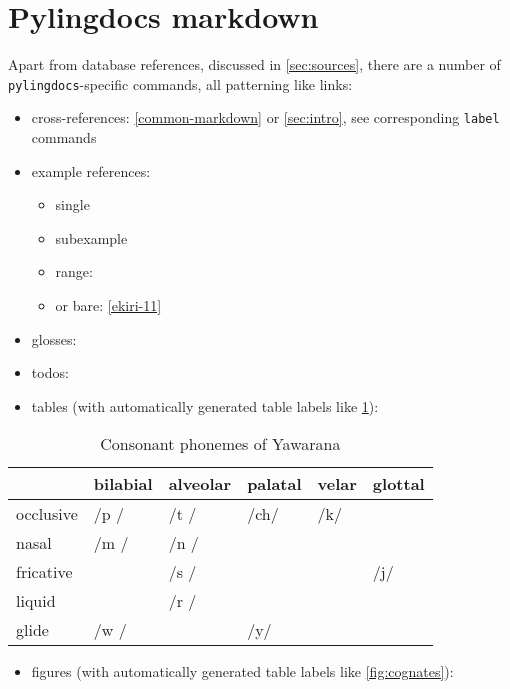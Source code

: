 \documentclass{article}
\begin{document}
\section{\texorpdfstring{Pylingdocs markdown
\label{pld-md}}{Pylingdocs markdown }}

Apart from database references, discussed in \cref{sec:sources}, there
are a number of \texttt{pylingdocs}-specific commands, all patterning
like links:

\begin{itemize}
\tightlist
\item
  cross-references: \cref{common-markdown} or \cref{sec:intro}, see
  corresponding \texttt{label} commands
\item
  example references:

  \begin{itemize}
  \tightlist
  \item
    single 
  \item
    subexample 
  \item
    range: 
  \item
    or bare: \ref{ekiri-11}
  \end{itemize}
\item
  glosses: 
\item
  todos:
\item
  tables (with automatically generated table labels like
  \cref{tab:consonants}):
\end{itemize}

\begin{table}
\caption{Consonant phonemes of Yawarana}
\label{tab:consonants}
\centering
\begin{tabular}{llllll}
\toprule
 & bilabial & alveolar & palatal & velar & glottal \\
\midrule
occlusive & /p / & /t / & /ch/ & /k/ &  \\
nasal & /m / & /n / &  &  &  \\
fricative &  & /s / &  &  & /j/ \\
liquid &  & /r / &  &  &  \\
glide & /w / &  & /y/ &  &  \\
\bottomrule
\end{tabular}

\end{table}

\begin{itemize}
\tightlist
\item
  figures (with automatically generated table labels like
  \cref{fig:cognates}):
\end{itemize}
\end{document}
